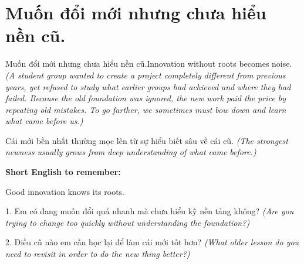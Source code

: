 \section{Muốn đổi mới nhưng chưa hiểu nền cũ.}
\begin{truyen}{Muốn đổi mới nhưng chưa hiểu nền cũ.}{Innovation without roots becomes noise.}
\textit{(A student group wanted to create a project completely different from previous years, yet refused to study what earlier groups had achieved and where they had failed. Because the old foundation was ignored, the new work paid the price by repeating old mistakes. To go farther, we sometimes must bow down and learn what came before us.)}
\end{truyen}
\begin{baihoc}
Cái mới bền nhất thường mọc lên từ sự hiểu biết sâu về cái cũ.
\textit{(The strongest newness usually grows from deep understanding of what came before.)}
\end{baihoc}
\begin{ghinhoanh}
\textbf{Short English to remember:}

Good innovation knows its roots.
\end{ghinhoanh}
\begin{tuhocnhanh}
1. Em có đang muốn đổi quá nhanh mà chưa hiểu kỹ nền tảng không? \textit{(Are you trying to change too quickly without understanding the foundation?)}

2. Điều cũ nào em cần học lại để làm cái mới tốt hơn? \textit{(What older lesson do you need to revisit in order to do the new thing better?)}
\end{tuhocnhanh}
\ngancach

